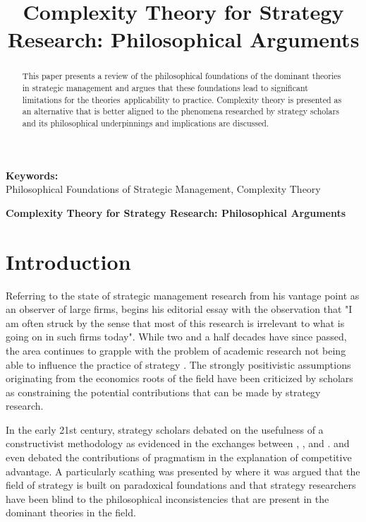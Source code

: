 \documentclass[12pt,letterpaper]{article}
\begin{document}
\title{Complexity Theory for Strategy Research: Philosophical Arguments}

\maketitle

\begin{abstract}
\normalsize
This paper presents a review of the philosophical foundations of the dominant theories in strategic management and argues that these foundations lead to significant limitations for the theories\textquotesingle  \ applicability to practice.  Complexity theory is presented as an alternative that is better aligned to the phenomena researched by strategy scholars and its philosophical underpinnings and implications are discussed.
\end{abstract}


{\textbf{Keywords:} \\\indent Philosophical Foundations of Strategic Management, Complexity Theory}

\newpage
\pagestyle{fancy}
\fancyhf{}
\cfoot{\thepage}
\begin{center}
\textbf{Complexity Theory for Strategy Research: Philosophical Arguments}
\end{center}
\section{Introduction}\label{S:Introduction}
Referring to the state of strategic management research from his vantage point as an observer of large firms, \cite{Bettis1991} begins his editorial essay with the observation that "I am often struck by the sense that most of this research is irrelevant to what is going on in such firms today". While two and a half decades have since passed, the area continues to grapple with the problem of academic research not being able to influence the practice of strategy \citep{Economist2007PracticallyIrrelevant}. The strongly positivistic assumptions originating from the economics roots of the field have been criticized by scholars as constraining the potential contributions that can be made by strategy research. 

In the early 21st century, strategy scholars debated on the usefulness of a constructivist methodology as evidenced in the exchanges between \cite{Mir2000}, \cite{Kwan2001}, and \cite{Mir2001}. \cite{Durand2002} and \cite{Powell2002} even debated the contributions of pragmatism in the explanation of competitive advantage. A particularly scathing was presented by \cite{Rasche2008}   where it was argued that the field of strategy is built on paradoxical foundations and that strategy researchers have been blind to the philosophical inconsistencies that are present in the dominant theories in the field. 
\end{document}
